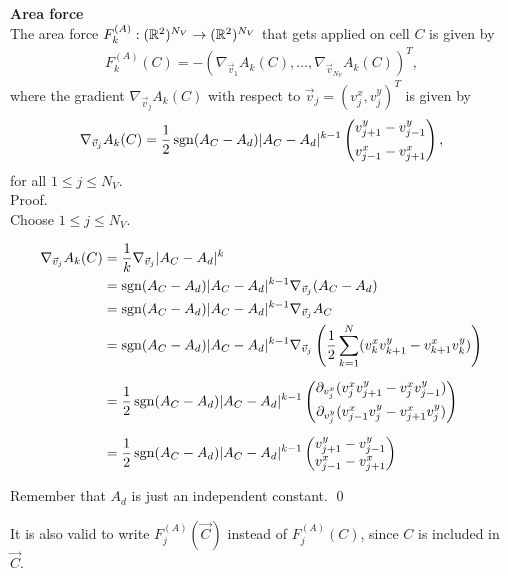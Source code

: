 \begin{proposition} \textbf{Area force} \label{force:area}\\
	The area force $F_{k}^{(A)}: (\mathbb{R}^2)^{N_V} \rightarrow (\mathbb{R}^2)^{N_V}$ that gets applied on cell $C$ is given by  
	\begin{align*}
		F_{k}^{(A)}(C) 
		= - (\nabla_{\vec{v}_1} A_k(C), \ldots, \nabla_{\vec{v}_{N_V}} A_k(C))^T,
	\end{align*}
	where the gradient $\nabla_{\vec{v}_j} A_k(C)$ with respect to $\vec{v}_j = (v_{j}^{x}, v_{j}^{y})^T$ is given by 
	\begin{align}
		\nabla_{\vec{v}_j} A_k(C) = \dfrac{1}{2} \operatorname{sgn}(A_{C} - A_d) |A_{C} - A_d|^{k-1} \begin{pmatrix} v_{j+1}^{y} - v_{j-1}^{y} \\[0.5em]  v_{j-1}^{x} - v_{j+1}^{x} \end{pmatrix},
		\label{gradient:area}
	\end{align}
	for all $1 \leq j \leq N_V$.\\


	Proof.\\
	Choose $1 \leq j \leq N_V$.  
 
	\begin{align*}
		\nabla_{\vec{v}_j} A_k(C) &= \frac{1}{k} \nabla_{\vec{v}_j} | A_{C} - A_d |^k  \\ 
		&= \operatorname{sgn}(A_{C} - A_d) | A_{C} - A_d |^{k-1} \nabla_{\vec{v}_j} (A_{C} - A_d) \\
		&= \operatorname{sgn}(A_{C} - A_d) | A_{C} - A_d |^{k-1} \nabla_{\vec{v}_j} A_{C} \\
		&= \operatorname{sgn}(A_{C} - A_d) | A_{C} - A_d |^{k-1} \nabla_{\vec{v}_j} \left(\frac{1}{2} \sum\limits_{k = 1}^{N} (v_k^{x} v_{k+1}^{y} - v_{k+1}^{x} v_k^{y})\right) \\[0.5em]  
		&= \frac{1}{2} \operatorname{sgn}(A_{C} - A_d) | A_{C} - A_d |^{k-1} \begin{pmatrix}
				\partial_{v_j^{x}} (v_j^{x} v_{j+1}^{y} - v_j^{x} v_{j-1}^{y})  \\[0.5em]
				\partial_{v_j^{y}} (v_{j-1}^{x} v_j^{y} - v_{j+1}^{x} v_j^{y})
			\end{pmatrix} \\[0.5em] 
		&= \frac{1}{2} \operatorname{sgn}(A_{C} - A_d) | A_{C} - A_d |^{k-1} \begin{pmatrix}
				v_{j+1}^{y} - v_{j-1}^{y}  \\
				v_{j-1}^{x}  - v_{j+1}^{x} 
			\end{pmatrix} 
	\end{align*}

	Remember that $A_d$ is just an independent constant. 
	\qed
\end{proposition}
It is also valid to write $F_{j}^{(A)}(\vec{C})$ instead of $F_{j}^{(A)}(C)$, since $C$ is included in $\vec{C}$. 

